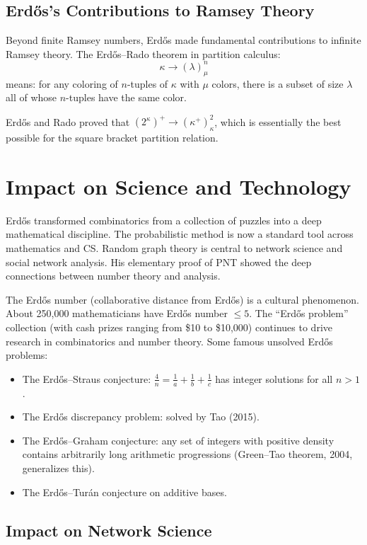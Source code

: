 \subsection{Erd\H{o}s's Contributions to Ramsey Theory}

Beyond finite Ramsey numbers, Erd\H{o}s made fundamental contributions to infinite Ramsey theory. The Erd\H{o}s--Rado theorem in partition calculus:
\[
\kappa \to (\lambda)^n_\mu
\]
means: for any coloring of $n$-tuples of $\kappa$ with $\mu$ colors, there is a subset of size $\lambda$ all of whose $n$-tuples have the same color.

Erd\H{o}s and Rado proved that $(2^\kappa)^+ \to (\kappa^+)^2_\kappa$, which is essentially the best possible for the square bracket partition relation.

\section{Impact on Science and Technology}

Erd\H{o}s transformed combinatorics from a collection of puzzles into a deep mathematical discipline. The probabilistic method is now a standard tool across mathematics and CS. Random graph theory is central to network science and social network analysis. His elementary proof of PNT showed the deep connections between number theory and analysis.

The Erd\H{o}s number (collaborative distance from Erd\H{o}s) is a cultural phenomenon. About 250,000 mathematicians have Erd\H{o}s number $\leq 5$. The ``Erd\H{o}s problem'' collection (with cash prizes ranging from \$10 to \$10,000) continues to drive research in combinatorics and number theory. Some famous unsolved Erd\H{o}s problems:
\begin{itemize}
    \item The Erd\H{o}s--Straus conjecture: $\frac{4}{n} = \frac{1}{a} + \frac{1}{b} + \frac{1}{c}$ has integer solutions for all $n > 1$.
    \item The Erd\H{o}s discrepancy problem: solved by Tao (2015).
    \item The Erd\H{o}s--Graham conjecture: any set of integers with positive density contains arbitrarily long arithmetic progressions (Green--Tao theorem, 2004, generalizes this).
    \item The Erd\H{o}s--Tur\'{a}n conjecture on additive bases.
\end{itemize}

\subsection{Impact on Network Science}

